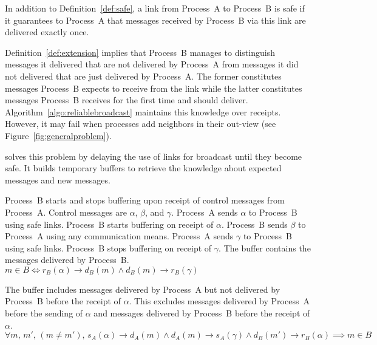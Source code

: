 \begin{definition}
  In addition to Definition~\ref{def:safe}, a link from Process~A to Process~B
  is safe if it guarantees to Process~A that messages received by Process~B via
  this link are delivered exactly once.
\end{definition}

Definition~\ref{def:extension} implies that Process~B manages to distinguish
messages it delivered that are not delivered by Process~A from messages it did
not delivered that are just delivered by Process~A. The former constitutes
messages Process~B expects to receive from the link while the latter constitutes
messages Process~B receives for the first time and should
deliver. Algorithm~\ref{algo:reliablebroadcast} maintains this knowledge over
receipts. However, it may fail when processes add neighbors in their out-view
(see Figure~\ref{fig:generalproblem}).

\RPCBROADCAST solves this problem by delaying the use of links for broadcast
until they become safe. It builds temporary buffers to retrieve the knowledge
about expected messages and new messages.

\begin{definition}
  Process~B starts and stops buffering upon receipt of control messages from
  Process~A. Control messages are $\alpha$, $\beta$, and $\gamma$. Process~A
  sends $\alpha$ to Process~B using safe links. Process~B starts buffering on
  receipt of $\alpha$. Process~B sends $\beta$ to Process~A using any
  communication means. Process~A sends $\gamma$ to Process~B using safe
  links. Process~B stops buffering on receipt of $\gamma$.
  The buffer contains the messages delivered by Process~B. \\
  $m \in B \Longleftrightarrow 
  r_B(\alpha) \rightarrow d_B(m) \wedge d_B(m) \rightarrow r_B(\gamma)$
\end{definition}

\begin{lemma}
  The buffer includes messages delivered by Process~A but not delivered by
  Process~B before the receipt of $\alpha$. This excludes messages delivered by
  Process~A before the sending of $\alpha$ and messages delivered by Process~B
  before the receipt of $\alpha$.\\
  $\forall m,\,m',\,(m\neq m'),\,
  s_A(\alpha) \rightarrow d_A(m) \wedge
  d_A(m) \rightarrow s_A(\gamma) \wedge
  d_B(m') \rightarrow r_B(\alpha) \implies m \in B$
\end{lemma}

